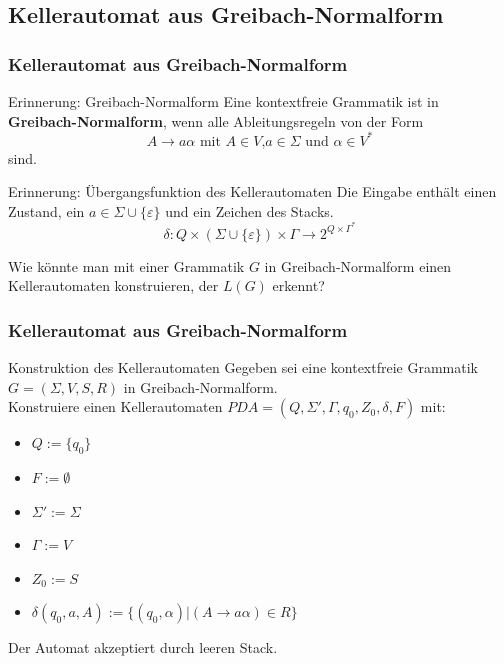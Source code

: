 \subsection{Kellerautomat aus Greibach-Normalform}
\begin{frame}
 \frametitle{Kellerautomat aus Greibach-Normalform}
 \begin{block}{Erinnerung: Greibach-Normalform}
  Eine kontextfreie Grammatik ist in \textbf{Greibach-Normalform}, wenn alle Ableitungsregeln von der Form   
  \[ A \rightarrow a\alpha \text{ mit } A \in V\text{,} a\in \Sigma \text{ und } \alpha \in V^*\]
  sind.
 \end{block}
 \pause
 \begin{block}{Erinnerung: Übergangsfunktion des Kellerautomaten}
 Die Eingabe enthält einen Zustand, ein $a \in \Sigma \cup \{\varepsilon\}$ und ein Zeichen des Stacks.
 \[\delta : Q \times ( \Sigma \cup \{\varepsilon\}) \times \Gamma \rightarrow 2^{Q \times \Gamma^*}\]
 \vspace{-0.5cm}
 \end{block}
 \pause
 Wie könnte man mit einer Grammatik $G$ in Greibach-Normalform einen Kellerautomaten konstruieren, der $L(G)$ erkennt?
\end{frame}

\begin{frame}
 \frametitle{Kellerautomat aus Greibach-Normalform}
 \begin{block}{Konstruktion des Kellerautomaten}
 Gegeben sei eine kontextfreie Grammatik \(G = (\Sigma, V, S, R)\) in Greibach-Normalform.\\
 Konstruiere einen Kellerautomaten \(PDA = (Q, \Sigma', \Gamma, q_0, Z_0, \delta, F)\) mit:
 \begin{itemize}
  \item $Q := \{q_0\}$
  \item $F := \emptyset$
  \item $\Sigma' := \Sigma$
  \item $\Gamma := V$
  \item $Z_0 := S$
  \item $\delta(q_0, a, A) :=  \{(q_0,\alpha) | (A \rightarrow a \alpha) \in R \}$
 \end{itemize}
 \end{block}
 \pause
 Der Automat akzeptiert durch leeren Stack.
\end{frame}

